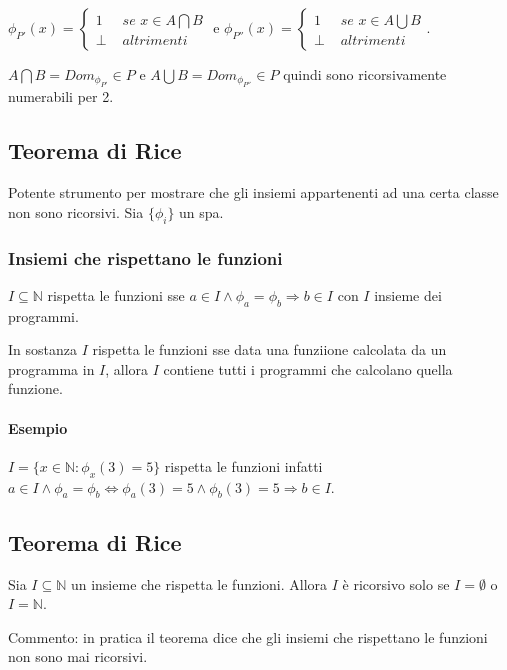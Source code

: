 \documentclass{article}
\begin{document}
$\phi_{P'}(x)=\begin{cases}
	1 &\textit{ se } x \in A \bigcap B \\
	\perp &\textit{ altrimenti}
\end{cases}$ e $\phi_{P''}(x)=\begin{cases}
	1 &\textit{ se } x \in A \bigcup B \\
	\perp &\textit{ altrimenti}
\end{cases}$. 



$A \bigcap B = Dom_{\phi_{P'}} \in P$ e $A \bigcup B = Dom_{\phi_{P''}} \in P$ quindi sono ricorsivamente numerabili per 2.

\subsection{Teorema di Rice}
Potente strumento per mostrare che gli insiemi appartenenti ad una certa classe non sono ricorsivi. Sia $\{ \phi_i \}$ un spa.
\subsubsection{Insiemi che rispettano le funzioni}
$I \subseteq \mathbb{N}$ rispetta le funzioni sse $a \in I \land \phi_a=\phi_b \Rightarrow b \in I $ con $I$ insieme dei programmi.




In sostanza $I$ rispetta le funzioni sse data una funziione calcolata da un programma in $I$, allora $I$ contiene tutti i programmi che calcolano quella funzione.
\paragraph{Esempio}
$I=\{ x \in \mathbb{N}: \phi_x(3)=5 \}$ rispetta le funzioni infatti $a \in I \land \phi_a=\phi_b \Leftrightarrow \phi_a(3)=5 \land \phi_b(3)=5 \Rightarrow b \in I$.
\subsection{Teorema di Rice}
Sia $ I \subseteq \mathbb{N}$ un insieme che rispetta le funzioni. Allora $I$ è ricorsivo solo se $I=\emptyset$ o $I=\mathbb{N}$.




Commento: in pratica il teorema dice che gli insiemi che rispettano le funzioni non sono mai ricorsivi.
\end{document}
